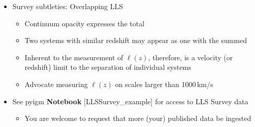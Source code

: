 \documentclass[12pt,letterpaper]{article}
\begin{document}
\begin{Aenumerate}
\begin{itemize}
  \item Survey subtleties: Overlapping LLS
  	\begin{itemize}
  	\item Continuum opacity expresses the total \nhi
  	\item Two systems with similar redshift may appear as one with 
  	the summed \nhi
  	\item Inherent to the measurement of $\ell(z)$, therefore, is a
  	velocity (or redshift) limit to the separation of individual systems
  	\item Advocate measuring $\ell(z)$ on scales larger than 1000\,km/s
  	\end{itemize}
  \item See pyigm {\bf Notebook} [LLSSurvey\_example]
  for access to LLS Survey data
  	\begin{itemize}
  	\item You are welcome to request that more (your) published
  	data be ingested 
  	\end{itemize}
 \end{itemize}


\end{Aenumerate}
\end{document}
